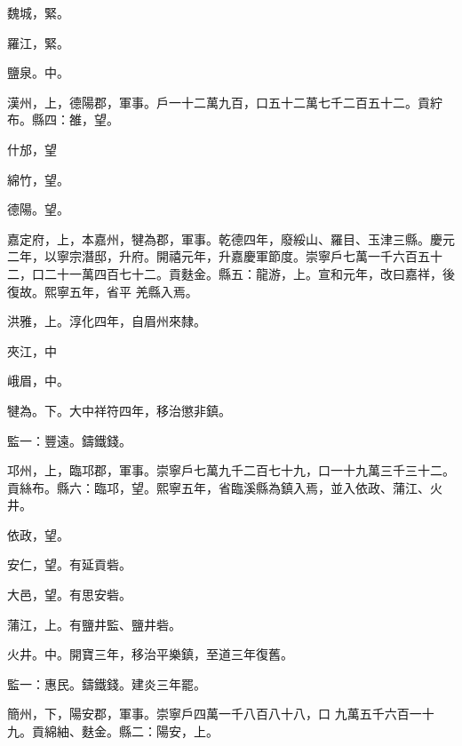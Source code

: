 \begin{pinyinscope}
 魏城，緊。



 羅江，緊。



 鹽泉。中。



 漢州，上，德陽郡，軍事。戶一十二萬九百，口五十二萬七千二百五十二。貢紵布。縣四：雒，望。



 什邡，望



 綿竹，望。



 德陽。望。



 嘉定府，上，本嘉州，犍為郡，軍事。乾德四年，廢綏山、羅目、玉津三縣。慶元二年，以寧宗潛邸，升府。開禧元年，升嘉慶軍節度。崇寧戶七萬一千六百五十二，口二十一萬四百七十二。貢麩金。縣五：龍游，上。宣和元年，改曰嘉祥，後復故。熙寧五年，省平
 羌縣入焉。



 洪雅，上。淳化四年，自眉州來隸。



 夾江，中



 峨眉，中。



 犍為。下。大中祥符四年，移治懲非鎮。



 監一：豐遠。鑄鐵錢。



 邛州，上，臨邛郡，軍事。崇寧戶七萬九千二百七十九，口一十九萬三千三十二。貢絲布。縣六：臨邛，望。熙寧五年，省臨溪縣為鎮入焉，並入依政、蒲江、火井。



 依政，望。



 安仁，望。有延貢砦。



 大邑，望。有思安砦。



 蒲江，上。有鹽井監、鹽井砦。



 火井。中。開寶三年，移治平樂鎮，至道三年復舊。



 監一：惠民。鑄鐵錢。建炎三年罷。



 簡州，下，陽安郡，軍事。崇寧戶四萬一千八百八十八，口
 九萬五千六百一十九。貢綿紬、麩金。縣二：陽安，上。




\end{pinyinscope}
